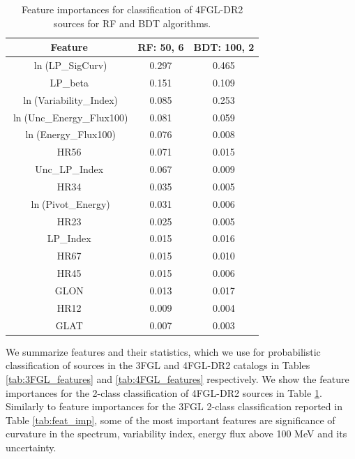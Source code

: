 \begin{table}[!h]
\caption{Feature importances for classification of 4FGL-DR2 sources for
RF and BDT algorithms.
}
\label{tab:feat_imp2}

\tiny
\centering
\renewcommand{\tabcolsep}{1mm}
\renewcommand{\arraystretch}{1}

\begin{tabular}{c c c}
\hline
\hline
Feature & RF: 50, 6& BDT: 100, 2\\
\hline
{ $\ln$(LP\_SigCurv)}&  0.297  & 0.465   \\
{LP\_beta}&0.151&0.109\\
{ $\ln$(Variability\_Index)} &0.085& 0.253   \\
$\ln$(Unc\_Energy\_Flux100)& 0.081&0.059  \\
$\ln$(Energy\_Flux100) & 0.076&0.008   \\
HR56&0.071& 0.015  \\
Unc\_LP\_Index & 0.067&0.009  \\
HR34& 0.035&0.005  \\
$\ln$(Pivot\_Energy)&0.031&0.006\\
HR23 &0.025& 0.005     \\
 LP\_Index& 0.015&0.016  \\
HR67&0.015&0.010\\
HR45&0.015&0.006\\
GLON&0.013&0.017\\
HR12&0.009&0.004\\
GLAT&0.007&0.003\\
\hline
\end{tabular}
\end{table}



We summarize features and their statistics,
which we use for probabilistic classification of sources in the 3FGL and 4FGL-DR2 catalogs
in Tables \ref{tab:3FGL_features} and \ref{tab:4FGL_features} respectively. 
We show the feature importances for the 2-class classification of 4FGL-DR2 sources in Table \ref{tab:feat_imp2}.
Similarly to feature importances for the 3FGL 2-class classification reported in Table \ref{tab:feat_imp}, 
some of the most important features are significance of curvature in the spectrum, variability index, energy flux above 100 MeV and its uncertainty.

